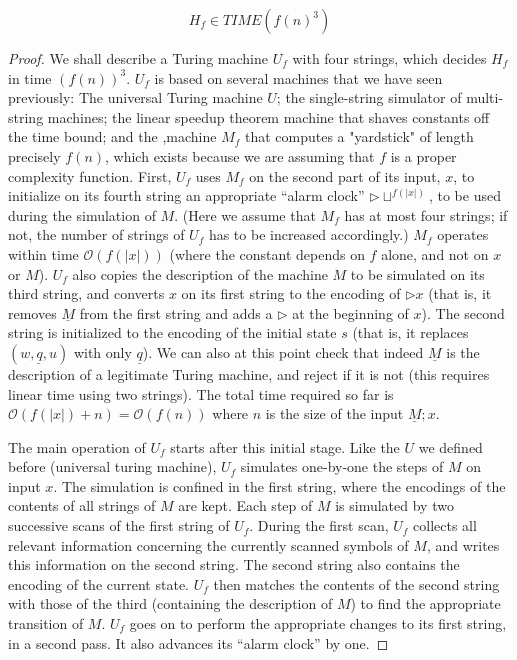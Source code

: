 \documentclass[12pt]{article}
\newcommand{\tr}{\triangleright}
\begin{document}
\begin{defbox}
$$H_f\in TIME(f(n)^3)$$
\end{defbox}
\begin{proof}
  We shall describe a Turing machine $U_f$ with four strings, which decides $H_f$ in time $(f(n))^3$. $U_f$ is based on several machines that we have seen previously: The universal Turing machine $U$; the single-string simulator of multi-string machines; the linear speedup theorem machine that shaves constants off the time bound; and the ,machine $M_f$ that computes a "yardstick" of length precisely $f(n)$, which exists because we are assuming that $f$ is a proper complexity function. First, $U_f$ uses $M_f$ on the second part of its input, $x$, to initialize on its fourth string an appropriate ``alarm clock'' $\triangleright \sqcup^{f(|x|)}$, to be used during the simulation of $M$. (Here we assume that $M_f$ has at most four strings; if not, the number of strings of $U_f$ has to be increased accordingly.) $M_f$ operates within time $\mathcal{O}(f(|x|))$ (where the constant depends on $f$ alone, and not on $x$ or $M$). $U_f$ also copies the description of the machine $M$ to be simulated on its third string, and converts $x$ on its first string to the encoding of $\triangleright x$ (that is, it removes $\underline M$ from the first string and adds a $\tr$ at the beginning of $x$). The second string is initialized to the encoding of the initial state $s$ (that is, it replaces $(\underline{w,q,u})$ with only $\underline q$). We can also at this point check that indeed $\underline M$ is the description of a legitimate Turing machine, and reject if it is not (this requires linear time using two strings). The total time required so far is $\mathcal{O}(f(|x|) + n) = \mathcal{O}(f(n))$ where $n$ is the size of the input $\underline M;x$.

  The main operation of $U_f$ starts after this initial stage. Like the $U$ we defined before (universal turing machine), $U_f$ simulates one-by-one the steps of $M$ on input $x$. The simulation is confined in the first string, where the encodings of the contents of all strings of $M$ are kept. Each step of $M$ is simulated by two successive scans of the first string of $U_f$. During the first scan, $U_f$ collects all relevant information concerning the currently scanned symbols of $M$, and writes this information on the second string. The second string also contains the encoding of the current state. $U_f$ then matches the contents of the second string with those of the third (containing the description of $M$) to find the appropriate transition of $M$. $U_f$ goes on to perform the appropriate changes to its first string, in a second pass. It also advances its ``alarm clock'' by one.
  

\end{proof}
\end{document}
